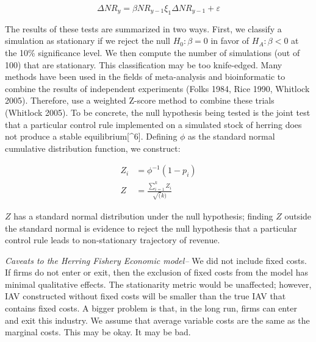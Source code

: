 \documentclass[]{article}
\begin{document}
\begin{equation}
\label{estimated}
\Delta NR_{y} = \beta  NR_{y-1} \xi_1 \Delta NR_{y-1} + \varepsilon 
\end{equation}

The results of these tests are summarized in two ways. First, we
classify a simulation as stationary if we reject the null
\(H_0: \beta=0\) in favor of \(H_A: \beta<0\) at the 10\% significance
level. We then compute the number of simulations (out of 100) that are
stationary. This classification may be too knife-edged. Many methods
have been used in the fields of meta-analysis and bioinformatic to
combine the results of independent experiments (Folks 1984, Rice 1990,
Whitlock 2005). Therefore, use a weighted Z-score method to combine
these trials (Whitlock 2005). To be concrete, the null hypothesis being
tested is the joint test that a particular control rule implemented on a
simulated stock of herring does not produce a stable
equilibrium{[}\^{}6{]}. Defining \(\phi\) as the standard normal
cumulative distribution function, we construct:

\begin{align}
Z_i &= \phi^{-1} (1-p_i)\\
Z  &= \frac{\sum_{i=1}^k Z_i}{\sqrt(k)}\end{align}

\(Z\) has a standard normal distribution under the null hypothesis;
finding \(Z\) outside the standard normal is evidence to reject the null
hypothesis that a particular control rule leads to non-stationary
trajectory of revenue.

\iffalse
I also applied Fisher's method:

\begin{align}
\chi^2_F =-2\sum_{i=1}^k ln(P_i),
\end{align}

all of the null hypotheses of the \(k\) tests are true, then this will
have a \(\chi^2\) distribution with \(2k\) degrees of freedom. A value
would near zero would be evidence \emph{for} the null hypothesis of
non-stationarity. \fi

\emph{Caveats to the Herring Fishery Economic model--} We did not
include fixed costs. If firms do not enter or exit, then the exclusion
of fixed costs from the model has minimal qualitative effects. The
stationarity metric would be unaffected; however, IAV constructed
without fixed costs will be smaller than the true IAV that contains
fixed costs. A bigger problem is that, in the long run, firms can enter
and exit this industry. We assume that average variable costs are the
same as the marginal costs. This may be okay. It may be bad.
\end{document}
